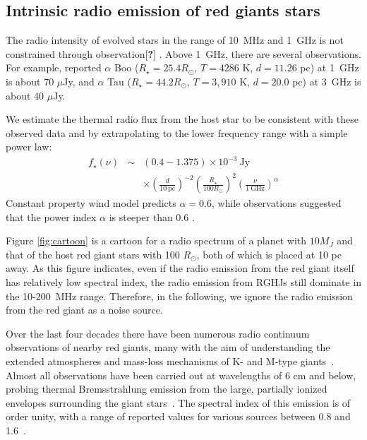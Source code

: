 \documentclass{emulateapj}
\def\memoYF#1{\color{red}$[${\bf #1}$]$ \color{black}}
\begin{document}
\subsection{Intrinsic radio emission of red giants stars}
\label{ss:RGradio}

The radio intensity of evolved stars in the range of 10~MHz and 1~GHz is not constrained through observation\memoYF{?}. 
Above 1~GHz, there are several observations. For example, \citet{gorman2013} reported $\alpha $ Boo ($R_\star = 25.4 R_{\odot }$, $T=4286$ K, $d=11.26$ pc) at 1~GHz is about 70 $\mu$Jy, and $\alpha $ Tau ($R_\star = 44.2  R_{\odot }$, $T=3,910$ K, $d=20.0$ pc) at 3~GHz is about 40 $\mu$Jy. 

We estimate the thermal radio flux from the host star to be consistent with these observed data and by extrapolating to the lower frequency range with a simple power law:
\begin{eqnarray}
\nonumber f_{\star }(\nu ) &\sim & (0.4-1.375) \times 10^{-3} ~\mbox{Jy} \\
&& \times \left( \frac{d}{10 ~\mbox{pc}} \right)^{-2}  \left( \frac{R_{\star }}{100 R_{\odot }} \right)^2 \left( \frac{\nu}{1~\mbox{GHz}} \right)^{\alpha } 
\end{eqnarray}
Constant property wind model \citep{wright1975,panagia1975,olnon1975} predicts $\alpha = 0.6$, while observations suggested that the power index $\alpha $ is steeper than 0.6 \citep{gorman2013}. 

Figure \ref{fig:cartoon} is a cartoon for a radio spectrum of a planet with $10M_J$ and that of the host red giant stars with 100 $R_{\odot }$, both of which is placed at 10 pc away. 
As this figure indicates, even if the radio emission from the red giant itself has relatively low spectral index, the radio emission from RGHJs still dominate in the 10-200~MHz range. 
Therefore, in the following, we ignore the radio emission from the red giant as a noise source. 


Over the last four decades there have been numerous radio continuum observations of nearby red giants, many with the aim of understanding the extended atmospheres and mass-loss mechanisms of K- and M-type giants~\citep[e.g.,][]{Newell1982, Knapp1995, Skinner1997, Lim1998, OGorman2013}.
Almost all observations have been carried out at wavelengths of 6 cm and below, probing thermal Bremsstrahlung emission from the large, partially ionized envelopes surrounding the giant stars~\citep{drake1986}.
The spectral index of this emission is of order unity, with a range of reported values for various sources between 0.8 and 1.6~\citep{OGorman2013}.
\end{document}
